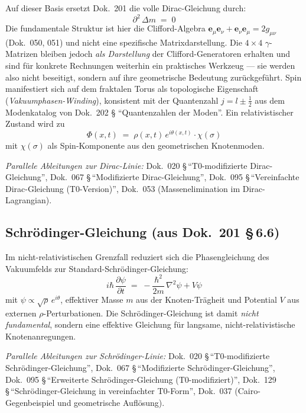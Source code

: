 Auf dieser Basis ersetzt Dok.~201 die volle Dirac-Gleichung durch:
\begin{equation}
  \partial^{2}\,\Delta m \;=\; 0
  \tag{202.\,QM-2}
\end{equation}
Die fundamentale Struktur ist hier die Clifford-Algebra
$\mathbf{e}_\mu\mathbf{e}_\nu + \mathbf{e}_\nu\mathbf{e}_\mu = 2g_{\mu\nu}$
(Dok.~050, 051) und nicht eine spezifische Matrixdarstellung. Die
$4\times 4$ $\gamma$-Matrizen bleiben jedoch \emph{als Darstellung} der
Clifford-Generatoren erhalten und sind für konkrete Rechnungen weiterhin
ein praktisches Werkzeug --- sie werden also nicht beseitigt, sondern
auf ihre geometrische Bedeutung zurückgeführt. Spin manifestiert sich
auf dem fraktalen Torus als topologische Eigenschaft
(\emph{Vakuumphasen-Winding}), konsistent mit der Quantenzahl
$j = l \pm \tfrac12$ aus dem Modenkatalog von Dok.~202 \S
\enquote{Quantenzahlen der Moden}. Ein relativistischer Zustand wird zu
\begin{equation}
  \Phi(x,t) \;=\; \rho(x,t)\,e^{i\theta(x,t)}\cdot \chi(\sigma)
  \tag{202.\,QM-3}
\end{equation}
mit $\chi(\sigma)$ als Spin-Komponente aus den geometrischen Knotenmoden.

\textit{Parallele Ableitungen zur Dirac-Linie:}
Dok.~020 \S\,\enquote{T0-modifizierte Dirac-Gleichung},
Dok.~067 \S\,\enquote{Modifizierte Dirac-Gleichung},
Dok.~095 \S\,\enquote{Vereinfachte Dirac-Gleichung (T0-Version)},
Dok.~053 (Massenelimination im Dirac-Lagrangian).

\subsection*{Schrödinger-Gleichung (aus Dok.~201 \S\,6.6)}

Im nicht-relativistischen Grenzfall reduziert sich die Phasengleichung
des Vakuumfelds zur Standard-Schrödinger-Gleichung:
\begin{equation}
  i\hbar\,\frac{\partial\psi}{\partial t}
  \;=\; -\frac{\hbar^{2}}{2m}\,\nabla^{2}\psi + V\psi
  \tag{202.\,QM-4}
\end{equation}
mit $\psi \propto \sqrt{\rho}\,e^{i\theta}$, effektiver Masse $m$ aus
der Knoten-Trägheit und Potential $V$ aus externen
$\rho$-Perturbationen. Die Schrödinger-Gleichung ist damit
\emph{nicht fundamental}, sondern eine effektive Gleichung für langsame,
nicht-relativistische Knotenanregungen.

\textit{Parallele Ableitungen zur Schrödinger-Linie:}
Dok.~020 \S\,\enquote{T0-modifizierte Schrödinger-Gleichung},
Dok.~067 \S\,\enquote{Modifizierte Schrödinger-Gleichung},
Dok.~095 \S\,\enquote{Erweiterte Schrödinger-Gleichung (T0-modifiziert)},
Dok.~129 \S\,\enquote{Schrödinger-Gleichung in vereinfachter T0-Form},
Dok.~037 (Cairo-Gegenbeispiel und geometrische Auflösung).

